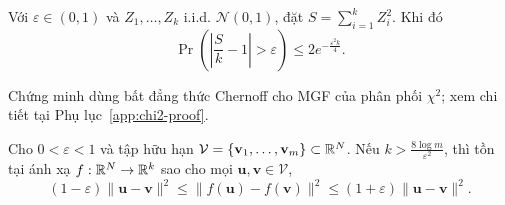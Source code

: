 \begin{lemma}
\label{lem:chi2-conc}
Với $\varepsilon \in (0,1)$ và $Z_1,\ldots,Z_k$ i.i.d. $\mathcal{N}(0,1)$, đặt $S = \sum_{i=1}^k Z_i^2$. Khi đó
\[
\Pr\!\left(\left|\frac{S}{k} - 1\right| > \varepsilon\right) \leq 2 e^{-\frac{\varepsilon^2 k}{4}}.
\]
\end{lemma}

Chứng minh dùng bất đẳng thức Chernoff cho MGF của phân phối $\chi^2$; xem chi tiết tại Phụ lục~\ref{app:chi2-proof}.

\begin{theorem}
\label{lem:jl}
Cho $0 < \varepsilon < 1$ và tập hữu hạn $\mathcal{V} = \{\mathbf{v}_1, \ldots, \mathbf{v}_m\} \subset \mathbb{R}^N$. Nếu $k > \frac{8 \log m}{\varepsilon^2}$, thì tồn tại ánh xạ $f : \mathbb{R}^N \to \mathbb{R}^k$ sao cho mọi $\mathbf{u}, \mathbf{v} \in \mathcal{V}$,
\[
(1-\varepsilon)\|\mathbf{u} - \mathbf{v}\|^2
\leq \|f(\mathbf{u}) - f(\mathbf{v})\|^2
\leq (1+\varepsilon)\|\mathbf{u} - \mathbf{v}\|^2.
\]
\end{theorem}

